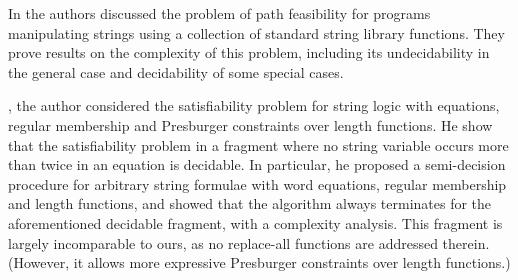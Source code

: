 %


In \cite{BTV09} the authors discussed the problem of path feasibility for programs manipulating strings using a collection of standard string library functions. They prove results on the complexity of this problem, including its undecidability in the general case and decidability of some special cases. 


\cite{L16}, the author considered the satisfiability problem for string logic with equations, regular membership and Presburger constraints over length functions. %
He show that the satisfiability problem in a fragment where no string variable occurs more than twice in an equation is decidable. In particular, he proposed a semi-decision procedure for arbitrary string formulae with word equations, regular membership and length functions, and showed that the algorithm always terminates for the aforementioned decidable fragment, with a complexity analysis. 
This fragment is largely incomparable to ours, as no replace-all functions are addressed therein. (However, it allows more expressive Presburger constraints over length functions.)


